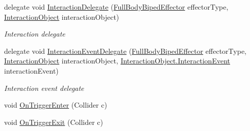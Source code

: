 \begin{DoxyCompactItemize}
delegate void \mbox{\hyperlink{class_root_motion_1_1_final_i_k_1_1_interaction_system_aa5a8c5136773b4244ab8f7ce707620b7}{Interaction\+Delegate}} (\mbox{\hyperlink{namespace_root_motion_1_1_final_i_k_ae0dd2058c7667b6f132c11a6b860c14a}{Full\+Body\+Biped\+Effector}} effector\+Type, \mbox{\hyperlink{class_root_motion_1_1_final_i_k_1_1_interaction_object}{Interaction\+Object}} interaction\+Object)
\begin{DoxyCompactList}\small\item\em Interaction delegate \end{DoxyCompactList}\item 
delegate void \mbox{\hyperlink{class_root_motion_1_1_final_i_k_1_1_interaction_system_ae04cc230b351d4b73458372899d3f6d8}{Interaction\+Event\+Delegate}} (\mbox{\hyperlink{namespace_root_motion_1_1_final_i_k_ae0dd2058c7667b6f132c11a6b860c14a}{Full\+Body\+Biped\+Effector}} effector\+Type, \mbox{\hyperlink{class_root_motion_1_1_final_i_k_1_1_interaction_object}{Interaction\+Object}} interaction\+Object, \mbox{\hyperlink{class_root_motion_1_1_final_i_k_1_1_interaction_object_1_1_interaction_event}{Interaction\+Object.\+Interaction\+Event}} interaction\+Event)
\begin{DoxyCompactList}\small\item\em Interaction event delegate \end{DoxyCompactList}\item 
void \mbox{\hyperlink{class_root_motion_1_1_final_i_k_1_1_interaction_system_a1d647a2214d27bbec80473b261376683}{On\+Trigger\+Enter}} (Collider c)
\item 
void \mbox{\hyperlink{class_root_motion_1_1_final_i_k_1_1_interaction_system_a6ab621e3f37037214d79e041df258b42}{On\+Trigger\+Exit}} (Collider c)
\end{DoxyCompactItemize}
